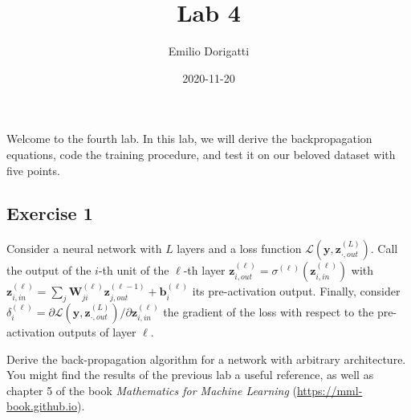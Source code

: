 \documentclass[
  a4paper,
]{article}
\title{Lab 4}
\author{Emilio Dorigatti}
\date{2020-11-20}
\begin{document}
\maketitle

Welcome to the fourth lab. In this lab, we will derive the
backpropagation equations, code the training procedure, and test it on
our beloved dataset with five points.

\hypertarget{exercise-1}{%
\subsection{Exercise 1}\label{exercise-1}}

Consider a neural network with \(L\) layers and a loss function
\(\mathcal{L}(\textbf{y},\textbf{z}^{(L)}_{\cdot,out})\). Call the
output of the \(i\)-th unit of the \(\ell\)-th layer
\(\textbf{z}^{(\ell)}_{i,out}=\sigma^{(\ell)}(\textbf{z}^{(\ell)}_{i,in})\)
with
\(\textbf{z}^{(\ell)}_{i,in}=\sum_j\textbf{W}^{(\ell)}_{ji}\textbf{z}^{(\ell-1)}_{j,out}+\textbf{b}^{(\ell)}_{i}\)
its pre-activation output. Finally, consider
\(\delta^{(\ell)}_i=\partial\mathcal{L}(\textbf{y},\textbf{z}^{(L)}_{\cdot,out})/\partial\mathbf{z}^{(\ell)}_{i,in}\)
the gradient of the loss with respect to the pre-activation outputs of
layer \(\ell\).

Derive the back-propagation algorithm for a network with arbitrary
architecture. You might find the results of the previous lab a useful
reference, as well as chapter 5 of the book \emph{Mathematics for
Machine Learning} (\url{https://mml-book.github.io}).
\end{document}
